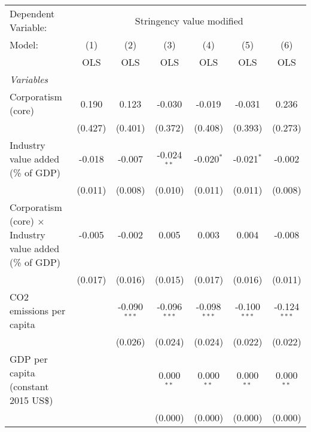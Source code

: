 
\begingroup
\centering
\begin{tabular}{lcccccc}
   \toprule
   Dependent Variable: & \multicolumn{6}{c}{Stringency value modified}\\
   Model:                                                         & (1)     & (2)            & (3)            & (4)            & (5)            & (6)\\  
                                                                  &  OLS    & OLS            & OLS            & OLS            & OLS            & OLS\\  
   \midrule
   \emph{Variables}\\
   Corporatism (core)                                             & 0.190   & 0.123          & -0.030         & -0.019         & -0.031         & 0.236\\   
                                                                  & (0.427) & (0.401)        & (0.372)        & (0.408)        & (0.393)        & (0.273)\\   
   Industry value added (\% of GDP)                               & -0.018  & -0.007         & -0.024$^{**}$  & -0.020$^{*}$   & -0.021$^{*}$   & -0.002\\   
                                                                  & (0.011) & (0.008)        & (0.010)        & (0.011)        & (0.011)        & (0.008)\\   
   Corporatism (core) $\times$ Industry value added (\% of GDP)   & -0.005  & -0.002         & 0.005          & 0.003          & 0.004          & -0.008\\   
                                                                  & (0.017) & (0.016)        & (0.015)        & (0.017)        & (0.016)        & (0.011)\\   
   CO2 emissions per capita                                       &         & -0.090$^{***}$ & -0.096$^{***}$ & -0.098$^{***}$ & -0.100$^{***}$ & -0.124$^{***}$\\   
                                                                  &         & (0.026)        & (0.024)        & (0.024)        & (0.022)        & (0.022)\\   
   GDP per capita (constant 2015 US\$)                            &         &                & 0.000$^{**}$   & 0.000$^{**}$   & 0.000$^{**}$   & 0.000$^{**}$\\   
                                                                  &         &                & (0.000)        & (0.000)        & (0.000)        & (0.000)\\   

\end{tabular}
